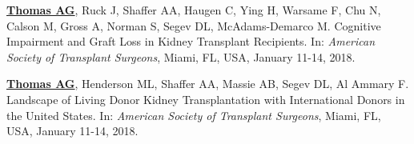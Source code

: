 \documentclass[10pt]{article}
\makeatletter
\newlength{\bibhang}
\newlength{\bibsep}
 {\@listi \global\bibsep\itemsep \global\advance\bibsep by\parsep}
\newenvironment{bibenum*}
  {\renewcommand\labelenumi{[\theenumi]}%
   \etaremune[
     topsep=0pt,
     itemsep=\bibsep,
     parsep=0pt,partopsep=0pt,
     itemindent=-\bibhang,
     leftmargin={\bibhang+\widthof{[999]}}]}
  {\endetaremune}
\makeatother
\begin{document}
\begin{bibenum*}
\item \underline{\textbf{Thomas AG}}, Ruck J, Shaffer AA, Haugen C,
  Ying H, Warsame F, Chu N, Calson M, Gross A, Norman S, Segev DL,
  McAdams-Demarco M. Cognitive Impairment and Graft Loss in
  Kidney Transplant Recipients.
  In: \emph{American Society of Transplant Surgeons},
  Miami, FL, USA, January 11-14, 2018.



\item \underline{\textbf{Thomas AG}}, Henderson ML, Shaffer AA,
  Massie AB, Segev DL, Al Ammary F. Landscape of Living Donor Kidney
  Transplantation with International Donors in the United States.
  In: \emph{American Society of Transplant Surgeons},
  Miami, FL, USA, January 11-14, 2018.





\end{bibenum*}
\end{document}

